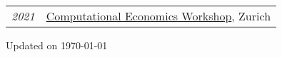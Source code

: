 \documentclass[11pt]{article}
\begin{document}
\begin{table}[h!]
\renewcommand{\arraystretch}{1.4}
    \begin{tabular}{p{90pt} p{380pt}}
        \textit{2021} &
        \href{https://sites.google.com/view/uzhjuddwkshop/}{Computational Economics
        Workshop}, Zurich
    \end{tabular}
\end{table}

\vspace{2.5cm}
\hfill Updated on \today


\end{document}
